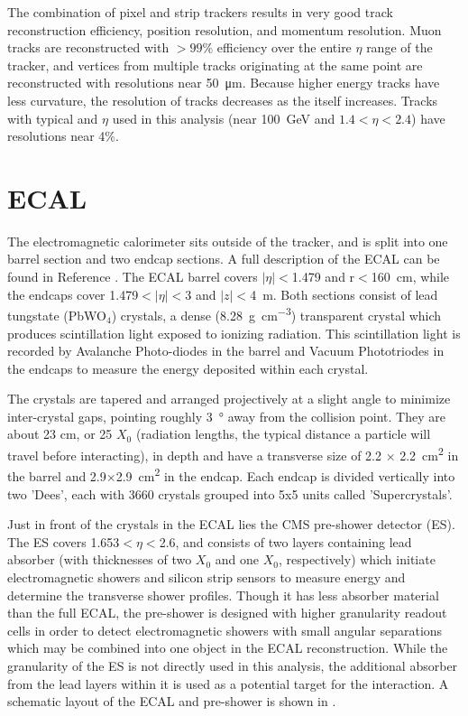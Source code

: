 The combination of pixel and strip trackers results in very good track reconstruction efficiency, position resolution, and momentum resolution.
Muon tracks are reconstructed with $>99\%$ efficiency over the entire $\eta$ range of the tracker, and vertices from multiple tracks originating at the same point are reconstructed with resolutions near \SI{50}{\micro\meter}.
Because higher energy tracks have less curvature, the \pt resolution of tracks decreases as the \pt itself increases. Tracks with typical \pt and $\eta$ used in this analysis (\pt near \SI{100}{\giga\eV} and $1.4<\eta<2.4$) have resolutions near 4$\%$. 

\section{ECAL}
The electromagnetic calorimeter sits outside of the tracker, and is split into one barrel section and two endcap sections. 
A full description of the ECAL can be found in Reference \cite{ECALtdr}.
The ECAL barrel covers $\lvert\eta\rvert<$1.479 and r$<$\SI{160}{\centi\meter}, while the endcaps cover 1.479$<\lvert\eta\rvert<$3 and $\lvert z \rvert<$\SI{4}{\meter}. 
Both sections consist of lead tungstate (PbWO$_4$) crystals, a dense (\SI{8.28}{\gram\per\cubic\centi\meter}) transparent crystal which produces scintillation light exposed to ionizing radiation. 
This scintillation light is recorded by Avalanche Photo-diodes in the barrel and Vacuum Phototriodes in the endcaps to measure the energy deposited within each crystal. 

The crystals are tapered and arranged projectively at a slight angle to minimize inter-crystal gaps, pointing roughly \SI{3}{\degree} away from the collision point. 
They are about 23 cm, or 25 $X_0$ (radiation lengths, the typical distance a particle will travel before interacting), in depth and have a transverse size of 2.2 $\times$ \SI{2.2}{\centi\meter^2} in the barrel and 2.9$\times$\SI{2.9}{\centi\meter^2} in the endcap. 
Each endcap is divided vertically into two 'Dees', each with 3660 crystals grouped into 5x5 units called 'Supercrystals'.

Just in front of the crystals in the ECAL lies the CMS pre-shower detector (ES). 
The ES covers 1.653$<\eta<$2.6, and consists of two layers containing lead absorber (with thicknesses of two $X_0$ and one $X_0$, respectively) which initiate electromagnetic showers and silicon strip sensors to measure energy and determine the transverse shower profiles. 
Though it has less absorber material than the full ECAL, the pre-shower is designed with higher granularity readout cells in order to detect electromagnetic showers with small angular separations which may be combined into one object in the ECAL reconstruction.
While the granularity of the ES is not directly used in this analysis, the additional absorber from the lead layers within it is used as a potential target for the \dbrem interaction.
A schematic layout of the ECAL and pre-shower is shown in .

